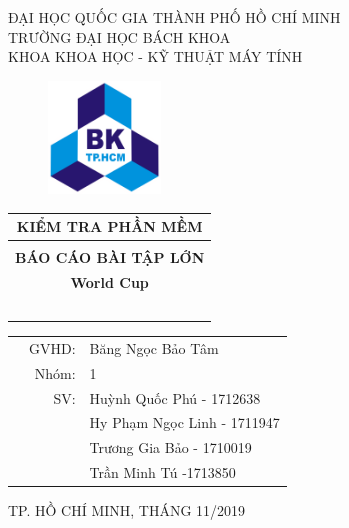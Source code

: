 \documentclass[a4paper]{article}
\begin{document}
\begin{titlepage}
\begin{center}
ĐẠI HỌC QUỐC GIA THÀNH PHỐ HỒ CHÍ MINH \\
TRƯỜNG ĐẠI HỌC BÁCH KHOA \\
KHOA KHOA HỌC - KỸ THUẬT MÁY TÍNH 
\end{center}

\vspace{1cm}

\begin{figure}[h!]
\begin{center}
\includegraphics[width=3cm]{hcmut.png}
\end{center}
\end{figure}

\vspace{1cm}


\begin{center}
\begin{tabular}{c}
\multicolumn{1}{c}{\textbf{{\Large KIỂM TRA PHẦN MỀM}}}\\
\hline
\\
\multicolumn{1}{c}{\textbf{{ BÁO CÁO BÀI TẬP LỚN}}}\\
\multicolumn{1}{c}{\textbf{{\Large World Cup}}}\\
~~\\
\hline
\end{tabular}
\end{center}

\vspace{2cm}

\begin{table}[h]
\begin{tabular}{rrl}
\hspace{5 cm} 
& GVHD: & Băng Ngọc Bảo Tâm \\
& Nhóm: & 1\\
& SV: & Huỳnh Quốc Phú  - 1712638 \\
& & Hy Phạm Ngọc Linh - 1711947\\
& & Trương Gia Bảo  - 1710019\\
& & Trần Minh Tú  -1713850\\
\end{tabular}
\end{table}
\begin{center}
{\footnotesize TP. HỒ CHÍ MINH, THÁNG 11/2019}
\end{center}
\end{titlepage}
\newpage
\end{document}
